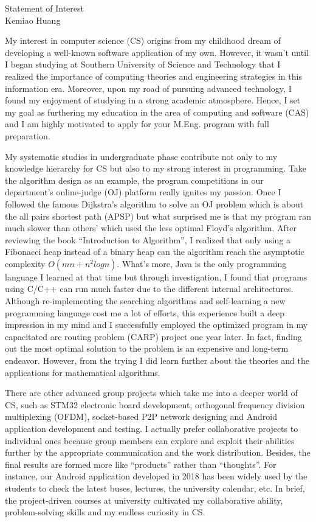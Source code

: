 \documentclass{article}
\newcommand{\soptitle}{Statement of Interest}
\newcommand{\yourname}{Kemiao Huang}
\begin{document}
\begin{center}\LARGE\soptitle\\
\large \yourname\ 
\end{center}

\setlength{\parskip}{0.3\baselineskip}

My interest in computer science (CS) origins from my childhood dream of developing a well-known software application of my own. However, it wasn't until I began studying at Southern University of Science and Technology that I realized the importance of computing theories and engineering strategies in this information era. Moreover, upon my road of pursuing advanced technology, I found my enjoyment of studying in a strong academic atmosphere. Hence, I set my goal as furthering my education in the area of computing and software (CAS) and I am highly motivated to apply for your M.Eng. program with full preparation.

My systematic studies in undergraduate phase contribute not only to my knowledge hierarchy for CS but also to my strong interest in programming. Take the algorithm design as an example, the program competitions in our department's online-judge (OJ) platform really ignites my passion. Once I followed the famous Dijkstra's algorithm to solve an OJ problem which is about the all pairs shortest path (APSP) but what surprised me is that my program ran much slower than others' which used the less optimal Floyd's algorithm. After reviewing the book ``Introduction to Algorithm'', I realized that only using a Fibonacci heap instead of a binary heap can the algorithm reach the asymptotic complexity $O(mn + n^2 log n)$. What's more, Java is the only programming language I learned at that time but through investigation, I found that programs using C/C++ can run much faster due to the different internal architectures. Although re-implementing the searching algorithms and self-learning a new programming language cost me a lot of efforts, this experience built a deep impression in my mind and I successfully employed the optimized program in my capacitated arc routing problem (CARP) project one year later. In fact, finding out the most optimal solution to the problem is an expensive and long-term endeavor. However, from the trying I did learn further about the theories and the applications for mathematical algorithms. 

There are other advanced group projects which take me into a deeper world of CS, such as STM32 electronic board development, orthogonal frequency division multiplexing (OFDM), socket-based P2P network designing and Android application development and testing. I actually prefer collaborative projects to individual ones because group members can explore and exploit their abilities further by the appropriate communication and the work distribution. Besides, the final results are formed more like ``products'' rather than ``thoughts''. For instance, our Android application developed in 2018 has been widely used by the students to check the latest buses, lectures, the university calendar, etc. In brief, the project-driven courses at university cultivated my collaborative ability, problem-solving skills and my endless curiosity in CS. 
\end{document}
